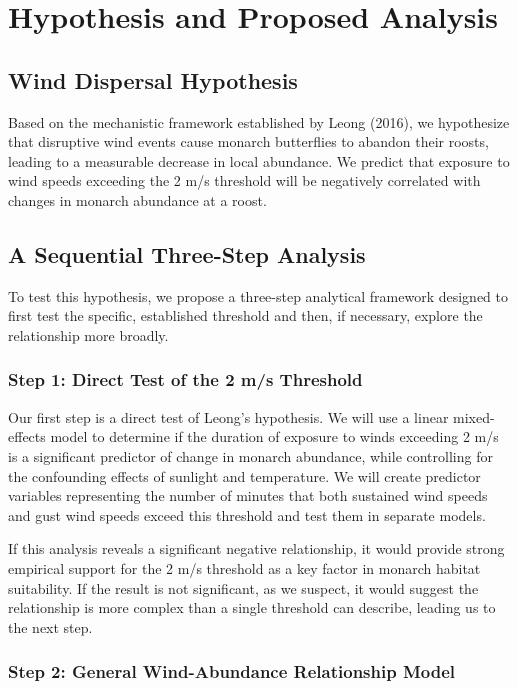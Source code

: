\section{Hypothesis and Proposed Analysis}

\subsection{Wind Dispersal Hypothesis}

Based on the mechanistic framework established by Leong (2016), we hypothesize that disruptive wind events cause monarch butterflies to abandon their roosts, leading to a measurable decrease in local abundance. We predict that exposure to wind speeds exceeding the 2 m/s threshold will be negatively correlated with changes in monarch abundance at a roost.

\subsection{A Sequential Three-Step Analysis}

To test this hypothesis, we propose a three-step analytical framework designed to first test the specific, established threshold and then, if necessary, explore the relationship more broadly.

\subsubsection{Step 1: Direct Test of the 2 m/s Threshold}

Our first step is a direct test of Leong's hypothesis. We will use a linear mixed-effects model to determine if the duration of exposure to winds exceeding 2 m/s is a significant predictor of change in monarch abundance, while controlling for the confounding effects of sunlight and temperature. We will create predictor variables representing the number of minutes that both sustained wind speeds and gust wind speeds exceed this threshold and test them in separate models.

If this analysis reveals a significant negative relationship, it would provide strong empirical support for the 2 m/s threshold as a key factor in monarch habitat suitability. If the result is not significant, as we suspect, it would suggest the relationship is more complex than a single threshold can describe, leading us to the next step.

\subsubsection{Step 2: General Wind-Abundance Relationship Model}

